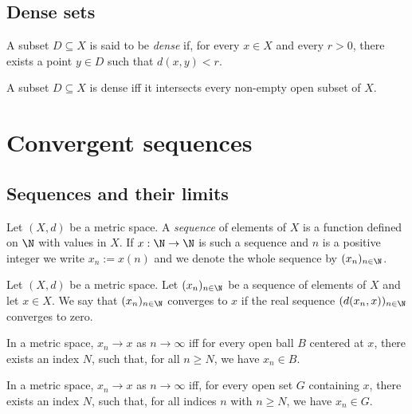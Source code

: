 \documentclass{article}
\begin{document}
\subsection{Dense sets}

\begin{definition}
	A subset $D\subseteq X$ is said to be \emph{dense} if, for every $x\in X$
	and every $r>0$, there exists a point $y\in D$ such that $d(x,y)<r$.
\end{definition}

\begin{proposition}[4.33]
	A subset $D\subseteq X$ is dense iff it intersects every non-empty open
	subset of $X$.
\end{proposition}

\section{Convergent sequences}

\subsection{Sequences and their limits}

\begin{definition}
	Let $(X,d)$ be a metric space. A \emph{sequence} of elements of $X$ is a function defined
	on $\N$ with values in $X$. If $x:\N\to\N$ is such a sequence and $n$ is a positive integer
	we write $x_n:=x(n)$ and we denote the whole sequence by $(x_n)_{n\in\N}$.
\end{definition}

\begin{definition}
	Let $(X,d)$ be a metric space. Let $(x_n)_{n\in\N}$ be a sequence of elements of $X$ and let
	$x\in X$. We say that $(x_n)_{n\in\N}$ converges to $x$ if the real sequence $(d(x_n,x))_{n\in\N}$
	converges to zero.
\end{definition}

\begin{proposition}[5.3]
	In a metric space, $x_n\to x$ as $n\to\infty$ iff for every open ball $B$ centered at $x$, there
	exists an index $N$, such that, for all $n\geq N$, we have $x_n\in B$.
\end{proposition}

\begin{proposition}[5.4]
	In a metric space, $x_n\to x$ as $n\to\infty$ iff, for every open set $G$ containing $x$, there
	exists an index $N$, such that, for all indices $n$ with $n\geq N$, we have $x_n\in G$.
\end{proposition}
\end{document}
